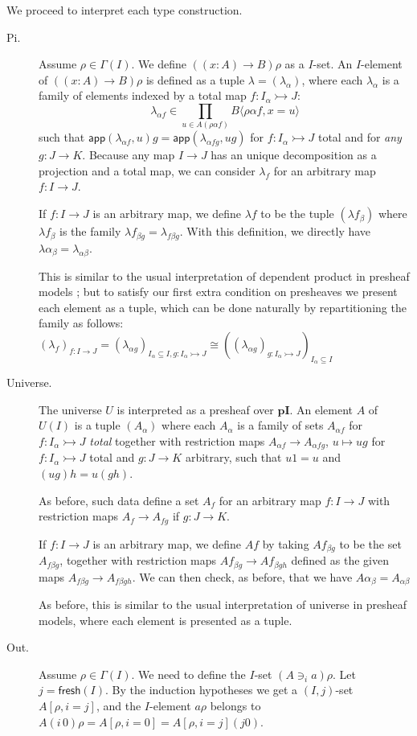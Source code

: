 \documentclass[english]{PaperTools/latex/entcs}
\theoremstyle{plain}
\theoremstyle{definition}
\theoremstyle{remark}
\newcommand\op[1]{∋_{#1}}
\def\pI{\ensuremath{\mathbf{pI}}}
\def\fresh#1{\mathsf{fresh}(#1)}
\def\app#1#2{\mathsf{app}(#1,#2)}
\begin{document}
\smallskip
We proceed to interpret each type construction.
\begin{description}
  \item[\sc Pi.]
    Assume $ρ ∈ Γ(I)$. We define $((x:A) → B)ρ$ as a $I$-set.
    An $I$-element of $((x:A) → B)ρ$ is defined as a tuple $λ = (λ_α)$,
    where each $λ_α$ is a family of elements indexed by a total map $f : I_α ↣ J$:
    $$λ_{α f} ∈ \prod_{u ∈ A(ραf)} B⟨ραf,x=u⟩$$
    such that
    $\app{λ_{αf}}{u} g = \app{λ_{α fg}}{ug}$ for $f : I_α ↣ J$ total and
    for \emph{any} $g : J → K$.
    Because any map $I → J$ has an unique decomposition as a projection and a total
    map, we can consider $λ_f$ for an arbitrary map $f : I → J$.

    If $f : I → J$ is an arbitrary map, we define $λ f$ to be the tuple
    $(λf_β)$ where $λf_β$ is the family $λf_{βg} = λ_{fβg}$.
    With this definition, we directly have $λα_{β} = λ_{αβ}$.

    This is similar to the usual interpretation of dependent product in
    presheaf models \citep{Hofmann97syntaxand,bezem2014model}; but to
    satisfy our first extra condition on presheaves we present
    each element as a tuple, which can be done naturally by repartitioning
    the family as follows:
    $(λ_f)_{f : I → J} = (λ_{αg})_{I_α ⊆ I, g : I_α ↣ J} ≅
     ((λ_{αg})_{g : I_α ↣ J})_{I_α ⊆ I}$


  \item[\sc Universe.]
    The universe $U$ is interpreted as a presheaf over \pI. An element $A$ of
    $U(I)$ is a tuple $(A_α)$ where each $A_α$ is a family of sets
    $A_{α f}$ for $f : I_α ↣ J$ \emph{total} together with restriction
    maps $A_{α f} → A_{α fg}$, $u ↦ ug$ for $f : I_α ↣ J$ total
    and $g : J → K$ arbitrary, such that $u1 = u$ and $(ug)h = u(gh)$.

    As before, such data define a set $A_f$ for an arbitrary map $f : I → J$
    with restriction maps $A_f → A_{fg}$ if $g : J → K$.

    If $f : I → J$ is an arbitrary map, we define $Af$ by taking $Af_{βg}$
    to be the set $A_{fβg}$, together with restriction maps $Af_{βg} → Af_{βgh}$
    defined as the given maps $A_{fβg} → A_{fβgh}$.
    We can then check, as before, that we have $Aα_{β} = A_{αβ}$

    As before, this is similar to the usual interpretation of universe in
    presheaf models, where each element is presented as a tuple.


  \item[\sc Out.]
    Assume $ρ ∈ Γ(I)$. We need to define the $I$-set $(A \op {i} a)ρ$.
    Let $j = \fresh I$.
    By the induction hypotheses we get a $(I,j)$-set $A[ρ,i=j]$,
    and the $I$-element $aρ$ belongs to
    $A(i\,0)ρ = A[ρ,i=0] = A[ρ,i=j](j 0)$.


\end{description}
\end{document}
